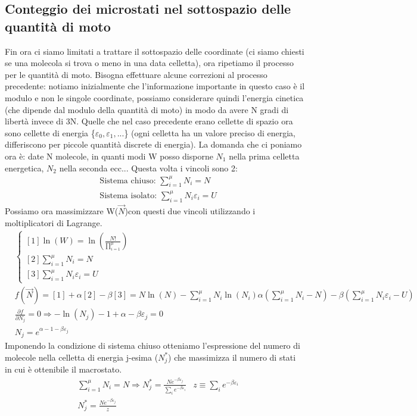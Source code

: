 \documentclass[10pt,a4paper]{article}
\begin{document}
\subsection{Conteggio dei microstati nel sottospazio delle quantità di moto}
Fin ora ci siamo limitati a trattare il sottospazio delle coordinate (ci siamo chiesti se una molecola si trova o meno in una data celletta), ora ripetiamo il processo per le quantità di moto. Bisogna effettuare alcune correzioni al processo precedente: notiamo inizialmente che l'informazione importante in questo caso è il modulo e non le singole coordinate, possiamo considerare quindi l'energia cinetica (che dipende dal modulo della quantità di moto) in modo da avere N gradi di libertà invece di 3N. Quelle che nel caso precedente erano cellette di spazio ora sono cellette di energia \{\(\varepsilon_0, \varepsilon_1,...\)\} (ogni celletta ha un valore preciso di energia, differiscono per piccole quantità discrete di energia). La domanda che ci poniamo ora è: date N molecole, in quanti modi W posso disporne \(N_1\) nella prima celletta energetica, \(N_2\) nella seconda ecc... Questa volta i vincoli sono 2:
\begin{align*}
&\text{Sistema chiuso: }\sum_{i=1}^\mu N_i = N\\
&\text{Sistema isolato: }\sum_{i=1}^\mu N_i\varepsilon_i = U
\end{align*}
Possiamo ora massimizzare W($\vec{N}$)con questi due vincoli utilizzando i moltiplicatori di Lagrange. 
\begin{align*}
	&\begin{cases}
		[1]\ln(W)=\ln \left(\frac{N!}{\prod_{i=1}^{\mu}}\right)\\
		[2]\sum_{i=1}^\mu N_i = N\\
		[3]\sum_{i=1}^\mu N_i\varepsilon_i = U
	\end{cases}\\
	&f(\vec{N})=[1]+\alpha[2]-\beta[3] = N\ln(N)-\sum_{i=1}^\mu N_i\ln(N_i)\alpha(\sum_{i=1}^\mu N_i - N)-\beta(\sum_{i=1}^\mu N_i\varepsilon_i - U)\\
	&\frac{\partial f}{\partial N_j} = 0 \Rightarrow -\ln(N_j)-1+\alpha-\beta\varepsilon_j = 0\\
	&N_j = e^{\alpha - 1-\beta\varepsilon_j}
\end{align*}
Imponendo la condizione di sistema chiuso otteniamo l'espressione del numero di molecole nella celletta di energia j-esima (\(N_j^*\)) che massimizza il numero di stati in cui è ottenibile il macrostato.
\begin{align*}
	&\sum_{i=1}^\mu N_i = N \Rightarrow N_j^* = \frac{Ne^{-\beta\varepsilon_j}}{\sum_ie^{-\beta\varepsilon_i}}
	&z\equiv \sum_ie^{-\beta\varepsilon_i}\\
	&N_j^* = \frac{Ne^{-\beta\varepsilon_j}}{z}
\end{align*} 
\end{document}
